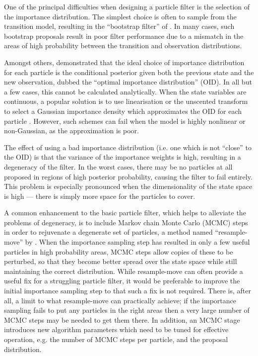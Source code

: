 \documentclass{article}
\begin{document}
One of the principal difficulties when designing a particle filter is the selection of the importance distribution. The simplest choice is often to sample from the transition model, resulting in the ``bootstrap filter'' of \citep{Gordon1993}. In many cases, such bootstrap proposals result in poor filter performance due to a mismatch in the areas of high probability between the transition and observation distributions.

Amongst others, \citet{Doucet2000a} demonstrated that the ideal choice of importance distribution for each particle is the conditional posterior given both the previous state and the new observation, dubbed the ``optimal importance distribution'' (OID). In all but a few cases, this cannot be calculated analytically. When the state variables are continuous, a popular solution is to use linearisation or the unscented transform to select a Gaussian importance density which approximates the OID for each particle \citep{Doucet2000a,Merwe2000}. However, such schemes can fail when the model is highly nonlinear or non-Gaussian, as the approximation is poor.

The effect of using a bad importance distribution (i.e. one which is not ``close'' to the OID) is that the variance of the importance weights is high, resulting in a degeneracy of the filter. In the worst cases, there may be no particles at all proposed in regions of high posterior probability, causing the filter to fail entirely. This problem is especially pronounced when the dimensionality of the state space is high --- there is simply more space for the particles to cover.
%

A common enhancement to the basic particle filter, which helps to alleviate the problems of degeneracy, is to include Markov chain Monte Carlo (MCMC) steps in order to rejuvenate a degenerate set of particles, a method named ``resample-move'' by \citet{Gilks2001}. When the importance sampling step has resulted in only a few useful particles in high probability areas, MCMC steps allow copies of these to be perturbed, so that they become better spread over the state space while still maintaining the correct distribution. While resample-move can often provide a useful fix for a struggling particle filter, it would be preferable to improve the initial importance sampling step to that such a fix is not required. There is, after all, a limit to what resample-move can practically achieve; if the importance sampling fails to put any particles in the right areas then a very large number of MCMC steps may be needed to get them there. In addition, an MCMC stage introduces new algorithm parameters which need to be tuned for effective operation, e.g. the number of MCMC steps per particle, and the proposal distribution.
\end{document}
